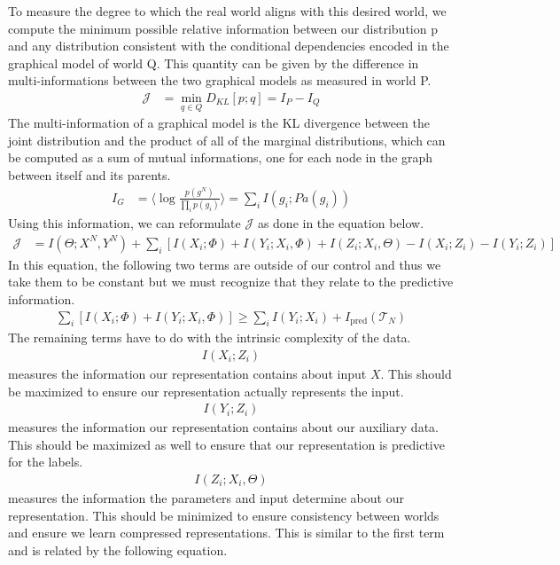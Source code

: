 \documentclass[book.tex]{subfiles}
\begin{document}
To measure the degree to which the real world aligns with this desired world, we compute the minimum possible relative information between our distribution p and any distribution consistent with the conditional dependencies encoded in the graphical model of world Q. This quantity can be given by the difference in multi-informations between the two graphical models as measured in world P.
\begin{align}
    \mathcal{J} &=\min_{q\in Q}D_{KL}[p;q]=I_P-I_Q
\end{align}
The multi-information of a graphical model is the KL divergence between the joint distribution and the product of all of the marginal distributions, which can be computed as a sum of mutual informations, one for each node in the graph between itself and its parents.
\begin{align}
I_G &=\langle \log\frac{p(g^N)}{\prod_i p(g_i)} \rangle = \sum_i I(g_i;Pa(g_i))
\end{align}
Using this information, we can reformulate $\mathcal{J}$ as done in the equation below.
\begin{align}
\mathcal{J} &=I(\Theta;X^N,Y^N)+\sum_i[I(X_i;\Phi) + I(Y_i;X_i,\Phi) + I(Z_i;X_i,\Theta) - I(X_i;Z_i) - I(Y_i;Z_i)]
\end{align}
In this equation, the following two terms are outside of our control and thus we take them to be constant but we must recognize that they relate to the predictive information.
\begin{align}
\sum_i[I(X_i;\Phi)+I(Y_i;X_i,\Phi)]\geq \sum_i I(Y_i;X_i) + I_{\textrm{pred}}(\mathcal{T}_N)
\end{align}
The remaining terms have to do with the intrinsic complexity of the data. 
\begin{align}
I(X_i;Z_i)
\end{align}
\noindent measures the information our representation contains about input $X$. This should be maximized to ensure our representation actually represents the input. 
\begin{align}
I(Y_i;Z_i)
\end{align} 
measures the information our representation contains about our auxiliary data. This should be maximized as well to ensure that our representation is predictive for the labels.
\begin{align}I(Z_i;X_i,\Theta)\end{align} 
\noindent measures the information the parameters and input determine about our representation. This should be minimized to ensure consistency between worlds and ensure we learn compressed representations. This is similar to the first term and is related by the following equation.
\end{document}
